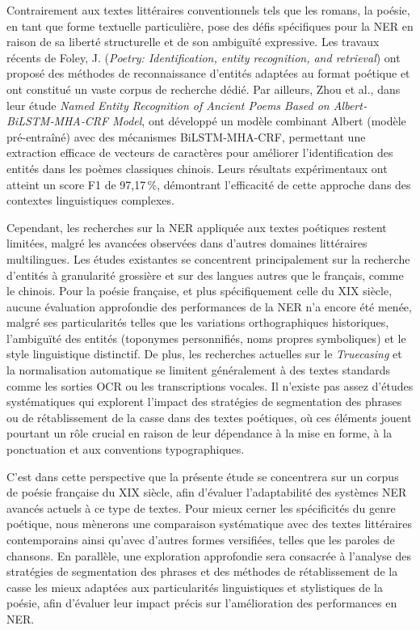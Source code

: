\par
Contrairement aux textes littéraires conventionnels tels que les romans, la poésie, en tant que forme textuelle particulière, pose des défis spécifiques pour la NER en raison de sa liberté structurelle et de son ambiguïté expressive. Les travaux récents de Foley, J. (\textit{Poetry: Identification, entity recognition, and retrieval}\cite{foley2019poetry}) ont proposé des méthodes de reconnaissance d'entités adaptées au format poétique et ont constitué un vaste corpus de recherche dédié. Par ailleurs, Zhou et al., dans leur étude \textit{Named Entity Recognition of Ancient Poems Based on Albert‐BiLSTM‐MHA‐CRF Model}\cite{zhou2022named}, ont développé un modèle combinant Albert (modèle pré-entraîné) avec des mécanismes BiLSTM-MHA-CRF, permettant une extraction efficace de vecteurs de caractères pour améliorer l'identification des entités dans les poèmes classiques chinois. Leurs résultats expérimentaux ont atteint un score F1 de 97,17\,\%, démontrant l'efficacité de cette approche dans des contextes linguistiques complexes.

\par
Cependant, les recherches sur la NER appliquée aux textes poétiques restent limitées, malgré les avancées observées dans d'autres domaines littéraires multilingues. Les études existantes se concentrent principalement sur la recherche d'entités à granularité grossière et sur des langues autres que le français, comme le chinois. Pour la poésie française, et plus spécifiquement celle du XIX siècle, aucune évaluation approfondie des performances de la NER n'a encore été menée, malgré ses particularités telles que les variations orthographiques historiques, l'ambiguïté des entités (toponymes personnifiés, noms propres symboliques) et le style linguistique distinctif. De plus, les recherches actuelles sur le \textit{Truecasing} et la normalisation automatique se limitent généralement à des textes standards comme les sorties OCR ou les transcriptions vocales. Il n'existe pas assez d’études systématiques qui explorent l'impact des stratégies de segmentation des phrases ou de rétablissement de la casse dans des textes poétiques, où ces éléments jouent pourtant un rôle crucial en raison de leur dépendance à la mise en forme, à la ponctuation et aux conventions typographiques.

\par
C'est dans cette perspective que la présente étude se concentrera sur un corpus de poésie française du XIX siècle, afin d'évaluer l’adaptabilité des systèmes NER avancés actuels à ce type de textes. Pour mieux cerner les spécificités du genre poétique, nous mènerons une comparaison systématique avec des textes littéraires contemporains ainsi qu'avec d’autres formes versifiées, telles que les paroles de chansons. En parallèle, une exploration approfondie sera consacrée à l'analyse des stratégies de segmentation des phrases et des méthodes de rétablissement de la casse les mieux adaptées aux particularités linguistiques et stylistiques de la poésie, afin d'évaluer leur impact précis sur l'amélioration des performances en NER. 

